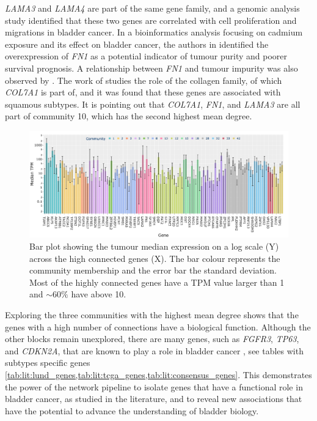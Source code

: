 \textit{LAMA3} and \textit{LAMA4} are part of the same gene family, and a genomic analysis study  \citep{Ma2024-xc} identified that these two genes are correlated with cell proliferation and migrations in bladder cancer. In a bioinformatics analysis focusing on cadmium exposure and its effect on bladder cancer, the authors in \citep{Zhang2023-ul} identified the overexpression of \textit{FN1} as a potential indicator of tumour purity and poorer survival prognosis. A relationship between \textit{FN1} and tumour impurity was also observed by \citep{Zhang2023-kv}.
The work of \citet{Guo2023-sf} studies the role of the collagen family, of which \textit{COL7A1} is part of, and it was found that these genes are associated with squamous subtypes. It is pointing out that \textit{COL7A1}, \textit{FN1}, and \textit{LAMA3} are all part of community 10, which has the second highest mean degree.


\begin{figure}[!t]    
    \centering
    \includegraphics[width=1.0\textwidth,height=1.0\textheight,keepaspectratio]{Sections/Network_II/resources/reward/smallCom_Exp.png}
   \caption[Tumour median TPMs of highly connected genes]{Bar plot showing the tumour median expression on a log scale (Y) across the high connected genes (X). The bar colour represents the community membership and the error bar the standard deviation. Most of the highly connected genes have a TPM value larger than 1 and $\sim60\%$ have above 10. }
    \label{fig:N_II:exp_molecular_highCon}
\end{figure}


Exploring the three communities with the highest mean degree shows that the genes with a high number of connections have a biological function. Although the other blocks remain unexplored, there are many genes, such as \textit{FGFR3}, \textit{TP63}, and \textit{CDKN2A}, that are known to play a role in bladder cancer \citep{Robertson2017-mg,Kamoun2020-tj,Marzouka2018-ge,Choi2014-ed}, see tables with subtypes specific genes \cref{tab:lit:lund_genes,tab:lit:tcga_genes,tab:lit:consensus_genes}. This demonstrates the power of the network pipeline to isolate genes that have a functional role in bladder cancer, as studied in the literature, and to reveal new associations that have the potential to advance the understanding of bladder biology.

